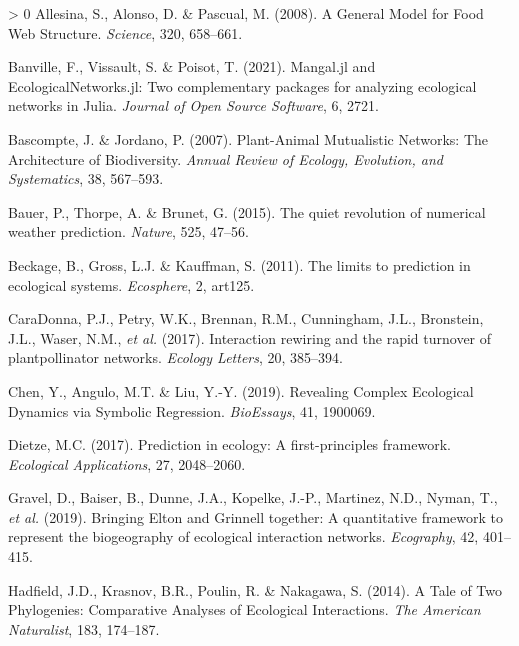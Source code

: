 \documentclass[11pt]{article}
\newlength{\cslhangindent}
\newenvironment{CSLReferences}[3] %
 {%
  \setlength{\parindent}{0pt}
  \ifodd #1 \everypar{\setlength{\hangindent}{\cslhangindent}}\ignorespaces\fi
  \ifnum #2 > 0
  \setlength{\parskip}{#2\baselineskip}
  \fi
 }%
 {}
\begin{document}
\hypertarget{refs}{}
\begin{CSLReferences}{1}{0}
\leavevmode\hypertarget{ref-Allesina2008GenMod}{}%
Allesina, S., Alonso, D. \& Pascual, M. (2008). A General Model for Food
Web Structure. \emph{Science}, 320, 658--661.

\leavevmode\hypertarget{ref-Banville2021ManJl}{}%
Banville, F., Vissault, S. \& Poisot, T. (2021). Mangal.jl and
EcologicalNetworks.jl: Two complementary packages for analyzing
ecological networks in Julia. \emph{Journal of Open Source Software}, 6,
2721.

\leavevmode\hypertarget{ref-Bascompte2007PlaMut}{}%
Bascompte, J. \& Jordano, P. (2007). Plant-Animal Mutualistic Networks:
The Architecture of Biodiversity. \emph{Annual Review of Ecology,
Evolution, and Systematics}, 38, 567--593.

\leavevmode\hypertarget{ref-Bauer2015QuiRev}{}%
Bauer, P., Thorpe, A. \& Brunet, G. (2015). The quiet revolution of
numerical weather prediction. \emph{Nature}, 525, 47--56.

\leavevmode\hypertarget{ref-Beckage2011LimPre}{}%
Beckage, B., Gross, L.J. \& Kauffman, S. (2011). The limits to
prediction in ecological systems. \emph{Ecosphere}, 2, art125.

\leavevmode\hypertarget{ref-CaraDonna2017IntRew}{}%
CaraDonna, P.J., Petry, W.K., Brennan, R.M., Cunningham, J.L.,
Bronstein, J.L., Waser, N.M., \emph{et al.} (2017). Interaction rewiring
and the rapid turnover of plantpollinator networks. \emph{Ecology
Letters}, 20, 385--394.

\leavevmode\hypertarget{ref-Chen2019RevCom}{}%
Chen, Y., Angulo, M.T. \& Liu, Y.-Y. (2019). Revealing Complex
Ecological Dynamics via Symbolic Regression. \emph{BioEssays}, 41,
1900069.

\leavevmode\hypertarget{ref-Dietze2017PreEco}{}%
Dietze, M.C. (2017). Prediction in ecology: A first-principles
framework. \emph{Ecological Applications}, 27, 2048--2060.

\leavevmode\hypertarget{ref-Gravel2019BriElt}{}%
Gravel, D., Baiser, B., Dunne, J.A., Kopelke, J.-P., Martinez, N.D.,
Nyman, T., \emph{et al.} (2019). Bringing Elton and Grinnell together: A
quantitative framework to represent the biogeography of ecological
interaction networks. \emph{Ecography}, 42, 401--415.

\leavevmode\hypertarget{ref-Hadfield2014TalTwo}{}%
Hadfield, J.D., Krasnov, B.R., Poulin, R. \& Nakagawa, S. (2014). A Tale
of Two Phylogenies: Comparative Analyses of Ecological Interactions.
\emph{The American Naturalist}, 183, 174--187.


\end{CSLReferences}
\end{document}
